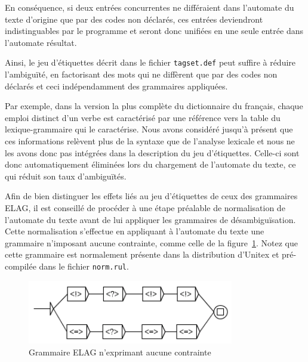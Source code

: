 \bigskip
\noindent En conséquence, si deux entrées concurrentes ne différaient dans l’automate du texte
d’origine que par des codes non déclarés, ces entrées deviendront indistinguables par le programme
et seront donc unifiées en une seule entrée dans l’automate résultat.


\bigskip
\noindent Ainsi, le jeu d’étiquettes décrit dans le fichier \verb$tagset.def$                                                                                peut suffire à
réduire l’ambiguïté, en factorisant des mots qui ne diffèrent que par des codes non déclarés
et ceci indépendamment des grammaires appliquées.


\bigskip
\noindent Par exemple, dans la version la plus complète du dictionnaire du français, chaque emploi
distinct d’un verbe est caractérisé par une référence vers la table du lexique-grammaire qui
le caractérise. Nous avons considéré jusqu’à présent que ces informations relèvent plus de
la syntaxe que de l’analyse lexicale et nous ne les avons donc pas intégrées dans la description
du jeu d’étiquettes. Celle-ci sont donc automatiquement éliminées lors du chargement de
l’automate du texte, ce qui réduit son taux d’ambiguïtés.


\bigskip
\noindent Afin de bien distinguer les effets liés au jeu d’étiquettes de ceux des grammaires
ELAG, il est conseillé de procéder à une étape préalable de normalisation de l’automate
du texte avant de lui appliquer les grammaires de désambiguïsation. Cette normalisation
s’effectue en appliquant à l’automate du texte une grammaire n’imposant aucune contrainte,
comme celle de la figure~\ref{fig-elag-norm}. Notez que cette grammaire est normalement présente
dans la distribution d’Unitex et pré-compilée dans le fichier
\verb+norm.rul+.

\begin{figure}[!h]
\begin{center}
\includegraphics[width=9cm]{resources/img/fig7-20.png}
\caption{Grammaire ELAG n’exprimant aucune contrainte\label{fig-elag-norm}}
\end{center}
\end{figure}

